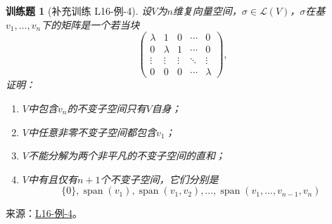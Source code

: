 \documentclass[12pt,fontset=fandol]{ctexart}
\newtheorem{exercise}{训练题}[section]
\begin{document}
\begin{exercise}[补充训练 L16-例-4]\label{prob:L16-例-4}
设$V$为$n$维复向量空间，$\sigma\in \mathcal{L}(V)$，$\sigma$在基$v_1,\ldots,v_n$下的矩阵是一个若当块
    \[\begin{pmatrix}
            \lambda & 1       & 0      & \cdots & 0       \\
            0       & \lambda & 1      & \cdots & 0       \\
            \vdots  & \vdots  & \vdots & \ddots & \vdots  \\
            0       & 0       & 0      & \cdots & \lambda
        \end{pmatrix},\]
    证明：
    \begin{enumerate}
        \item $V$中包含$v_n$的不变子空间只有$V$自身；

        \item $V$中任意非零不变子空间都包含$v_1$；

        \item $V$不能分解为两个非平凡的不变子空间的直和；

        \item $V$中有且仅有$n+1$个不变子空间，它们分别是
              \[\{0\},\operatorname{span}(v_1),\operatorname{span}(v_1,v_2),\ldots,\operatorname{span}(v_1,\ldots,v_{n-1},v_n)\]
    \end{enumerate}
\end{exercise}
\noindent 来源：\href{https://github.com/yhwu-is/Linear-Algebra-Left-Undone/blob/new/%E8%AE%B2%E4%B9%89/%E4%B8%93%E9%A2%98/16%20%E8%8B%A5%E5%BD%93%E6%A0%87%E5%87%86%E5%BD%A2.tex}{L16-例-4}。
\end{document}
